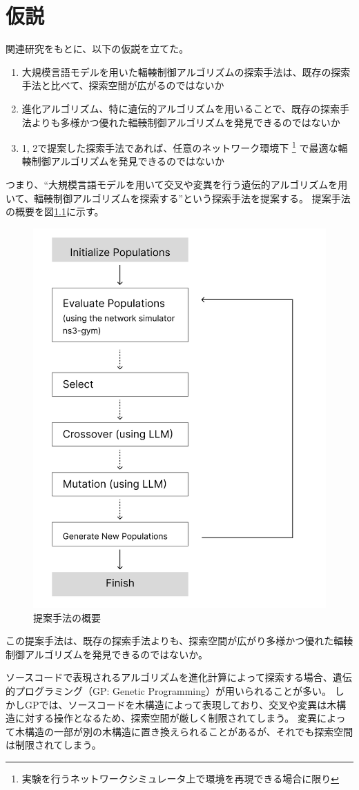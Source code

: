 \documentclass[a4paper,11pt]{jreport}
\newcommand{\figref}[1]{図\ref{#1}}
\begin{document}
\chapter{仮説}
\label{chapter:hypothesis}
関連研究をもとに、以下の仮説を立てた。
\begin{enumerate}
  \item 大規模言語モデルを用いた輻輳制御アルゴリズムの探索手法は、既存の探索手法と比べて、探索空間が広がるのではないか
  \item 進化アルゴリズム、特に遺伝的アルゴリズムを用いることで、既存の探索手法よりも多様かつ優れた輻輳制御アルゴリズムを発見できるのではないか
  \item 1, 2で提案した探索手法であれば、任意のネットワーク環境下
  \footnote{実験を行うネットワークシミュレータ上で環境を再現できる場合に限り}
  で最適な輻輳制御アルゴリズムを発見できるのではないか
\end{enumerate}
つまり、``大規模言語モデルを用いて交叉や変異を行う遺伝的アルゴリズムを用いて、輻輳制御アルゴリズムを探索する''という探索手法を提案する。
提案手法の概要を\figref{figure:proposed_flow}に示す。
\begin{figure}[htbp]
  \centering
  \includegraphics[width=0.4\linewidth]{fig/chap03/proposed_flow.png}
  \caption{提案手法の概要}
  \label{figure:proposed_flow}
\end{figure}
この提案手法は、既存の探索手法よりも、探索空間が広がり多様かつ優れた輻輳制御アルゴリズムを発見できるのではないか。

ソースコードで表現されるアルゴリズムを進化計算によって探索する場合、遺伝的プログラミング（GP: Genetic Programming）が用いられることが多い。
しかしGPでは、ソースコードを木構造によって表現しており、交叉や変異は木構造に対する操作となるため、探索空間が厳しく制限されてしまう。
変異によって木構造の一部が別の木構造に置き換えられることがあるが、それでも探索空間は制限されてしまう。
\end{document}
